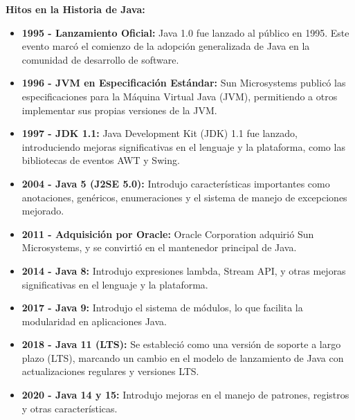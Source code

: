 \documentclass{article}
\begin{document}
	\textbf{Hitos en la Historia de Java:}
	\begin{itemize}
		\item \textbf{1995 - Lanzamiento Oficial:} Java 1.0 fue lanzado al público en 1995. Este evento marcó el comienzo de la adopción generalizada de Java en la comunidad de desarrollo de software.
		
		\item \textbf{1996 - JVM en Especificación Estándar:} Sun Microsystems publicó las especificaciones para la Máquina Virtual Java (JVM), permitiendo a otros implementar sus propias versiones de la JVM.
		
		\item \textbf{1997 - JDK 1.1:} Java Development Kit (JDK) 1.1 fue lanzado, introduciendo mejoras significativas en el lenguaje y la plataforma, como las bibliotecas de eventos AWT y Swing.
		
		\item \textbf{2004 - Java 5 (J2SE 5.0):} Introdujo características importantes como anotaciones, genéricos, enumeraciones y el sistema de manejo de excepciones mejorado.
		
		\item \textbf{2011 - Adquisición por Oracle:} Oracle Corporation adquirió Sun Microsystems, y se convirtió en el mantenedor principal de Java.
		
		\item \textbf{2014 - Java 8:} Introdujo expresiones lambda, Stream API, y otras mejoras significativas en el lenguaje y la plataforma.
		
		\item \textbf{2017 - Java 9:} Introdujo el sistema de módulos, lo que facilita la modularidad en aplicaciones Java.
		
		\item \textbf{2018 - Java 11 (LTS):} Se estableció como una versión de soporte a largo plazo (LTS), marcando un cambio en el modelo de lanzamiento de Java con actualizaciones regulares y versiones LTS.
		
		\item \textbf{2020 - Java 14 y 15:} Introdujo mejoras en el manejo de patrones, registros y otras características.
	\end{itemize}
	
\end{document}
